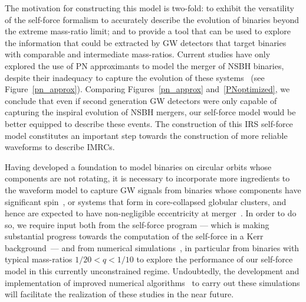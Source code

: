 The motivation for constructing this model is two-fold: to exhibit the versatility of the self-force formalism to accurately describe the evolution of binaries beyond the extreme mass-ratio limit; and to provide a tool that can be used to explore the information that could be extracted by GW detectors that target binaries with comparable and intermediate mass-ratios. Current studies have only explored the use of PN approximants to model the merger of NSBH  binaries, despite their inadequacy to capture the evolution of these systems~\cite{Prayush:2013a,  pnbuo, Nitz:2013mxa} (see Figure~\ref{pn_approx}). Comparing  Figures~\ref{pn_approx} and~\ref{PNoptimized}, we conclude that even if second generation GW detectors were only capable of capturing the inspiral evolution of NSBH mergers, our self-force model would be better equipped to describe these events. The construction of this IRS self-force model constitutes an important step towards the construction of more reliable waveforms to describe  IMRCs. 


Having developed a foundation to model binaries on circular orbits whose components are not rotating, it is necessary to incorporate more ingredients to the waveform model to capture GW signals from binaries whose components have significant spin~\cite{Foucart:2012, BuonannoEOBv2Main, maeda, burko, smallbody, buoerr1, buoII, TaylorT4Origin}, or systems that form in core-collapsed globular clusters, and hence are expected to have non-negligible eccentricity at merger~\cite{Leary:2009, Huerta:2013a}. In order to do so, we require input both from the self-force program --- which is making substantial progress towards the computation of the self-force in a Kerr background~\cite{Fan:2013b, Sam:2011,Pound:2013}--- and from numerical simulations~\cite{Mroue:2013xna}, in particular from binaries with typical mass-ratios \(1/20<q<1/10\) to explore the performance of our self-force model in this currently unconstrained regime. Undoubtedly, the development and implementation of improved numerical 
algorithms~\cite{Fan:2013a}  to carry out these simulations will facilitate the realization of these studies in the near future.

